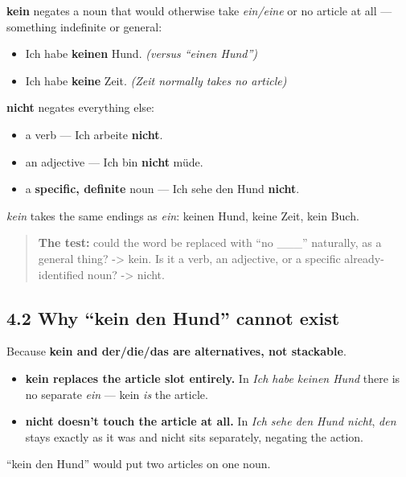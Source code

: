 \documentclass[
  11pt,
]{article}
\providecommand{\tightlist}{%
  \setlength{\itemsep}{0pt}\setlength{\parskip}{0pt}}
\begin{document}
\textbf{kein} negates a noun that would otherwise take \emph{ein/eine}
or no article at all --- something indefinite or general:

\begin{itemize}
\tightlist
\item
  Ich habe \textbf{keinen} Hund. \emph{(versus ``einen Hund'')}
\item
  Ich habe \textbf{keine} Zeit. \emph{(Zeit normally takes no article)}
\end{itemize}

\textbf{nicht} negates everything else:

\begin{itemize}
\tightlist
\item
  a verb --- Ich arbeite \textbf{nicht}.
\item
  an adjective --- Ich bin \textbf{nicht} müde.
\item
  a \textbf{specific, definite} noun --- Ich sehe den Hund
  \textbf{nicht}.
\end{itemize}

\emph{kein} takes the same endings as \emph{ein}: keinen Hund, keine
Zeit, kein Buch.

\begin{quote}
\textbf{The test:} could the word be replaced with ``no \_\_\_''
naturally, as a general thing? -\textgreater{} kein. Is it a verb, an
adjective, or a specific already-identified noun? -\textgreater{} nicht.
\end{quote}

\subsection{4.2 Why ``kein den Hund'' cannot
exist}\label{why-kein-den-hund-cannot-exist}

Because \textbf{kein and der/die/das are alternatives, not stackable}.

\begin{itemize}
\tightlist
\item
  \textbf{kein replaces the article slot entirely.} In \emph{Ich habe
  keinen Hund} there is no separate \emph{ein} --- kein \emph{is} the
  article.
\item
  \textbf{nicht doesn't touch the article at all.} In \emph{Ich sehe den
  Hund nicht}, \emph{den} stays exactly as it was and nicht sits
  separately, negating the action.
\end{itemize}

``kein den Hund'' would put two articles on one noun.
\end{document}
